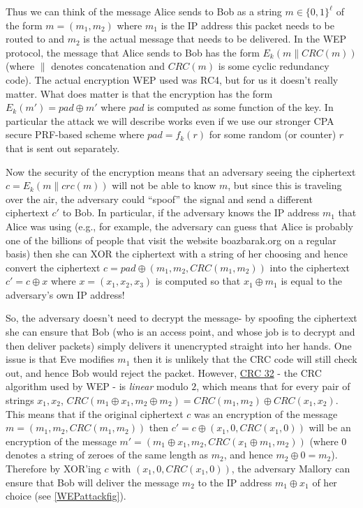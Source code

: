 Thus we can think of the message Alice sends to Bob as a string
\(m\in\{0,1\}^\ell\) of the form \(m=(m_1,m_2)\) where \(m_1\) is the IP
address this packet needs to be routed to and \(m_2\) is the actual
message that needs to be delivered. In the WEP protocol, the message
that Alice sends to Bob has the form
\(E_k(m\|\ensuremath{\mathit{CRC}}(m))\) (where \(\|\) denotes
concatenation and \(\ensuremath{\mathit{CRC}}(m)\) is some cyclic
redundancy code). The actual encryption WEP used was RC4, but for us it
doesn't really matter. What does matter is that the encryption has the
form \(E_k(m') = pad \oplus m'\) where \(pad\) is computed as some
function of the key. In particular the attack we will describe works
even if we use our stronger CPA secure PRF-based scheme where
\(pad=f_k(r)\) for some random (or counter) \(r\) that is sent out
separately.

Now the security of the encryption means that an adversary seeing the
ciphertext \(c=E_k(m\|crc(m))\) will not be able to know \(m\), but
since this is traveling over the air, the adversary could ``spoof'' the
signal and send a different ciphertext \(c'\) to Bob. In particular, if
the adversary knows the IP address \(m_1\) that Alice was using (e.g.,
for example, the adversary can guess that Alice is probably one of the
billions of people that visit the website boazbarak.org on a regular
basis) then she can XOR the ciphertext with a string of her choosing and
hence convert the ciphertext
\(c = pad \oplus (m_1,m_2,\ensuremath{\mathit{CRC}}(m_1,m_2))\) into the
ciphertext \(c' = c \oplus x\) where \(x=(x_1,x_2,x_3)\) is computed so
that \(x_1 \oplus m_1\) is equal to the adversary's own IP address!

So, the adversary doesn't need to decrypt the message- by spoofing the
ciphertext she can ensure that Bob (who is an access point, and whose
job is to decrypt and then deliver packets) simply delivers it
unencrypted straight into her hands. One issue is that Eve modifies
\(m_1\) then it is unlikely that the CRC code will still check out, and
hence Bob would reject the packet. However,
\href{https://goo.gl/5aqEHB}{CRC 32} - the CRC algorithm used by WEP -
is \emph{linear} modulo \(2\), which means that for every pair of
strings \(x_1,x_2\),
\(\ensuremath{\mathit{CRC}}(m_1\oplus x_1,m_2 \oplus m_2)=\ensuremath{\mathit{CRC}}(m_1,m_2)\oplus \ensuremath{\mathit{CRC}}(x_1,x_2)\).
This means that if the original ciphertext \(c\) was an encryption of
the message \(m=(m_1,m_2,\ensuremath{\mathit{CRC}}(m_1,m_2))\) then
\(c'=c \oplus (x_1,0,\ensuremath{\mathit{CRC}}(x_1,0))\) will be an
encryption of the message
\(m'=(m_1 \oplus x_1, m_2, \ensuremath{\mathit{CRC}}(x_1\oplus m_1,m_2))\)
(where \(0\) denotes a string of zeroes of the same length as \(m_2\),
and hence \(m_2 \oplus 0 = m_2\)). Therefore by XOR'ing \(c\) with
\((x_1,0,\ensuremath{\mathit{CRC}}(x_1,0))\), the adversary Mallory can
ensure that Bob will deliver the message \(m_2\) to the IP address
\(m_1 \oplus x_1\) of her choice (see \cref{WEPattackfig}).

